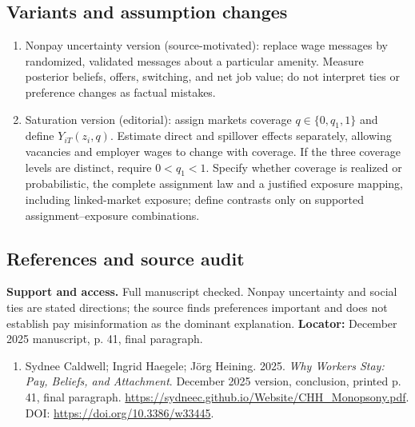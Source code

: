 \documentclass[11pt,a4paper]{article}
\begin{document}
\subsection*{Variants and assumption changes}
\begin{enumerate}
\item Nonpay uncertainty version (source-motivated): replace wage messages by randomized, validated messages about a particular amenity. Measure posterior beliefs, offers, switching, and net job value; do not interpret ties or preference changes as factual mistakes.
\item Saturation version (editorial): assign markets coverage \(q\in\{0,q_1,1\}\) and define \(Y_{iT}(z_i,q)\). Estimate direct and spillover effects separately, allowing vacancies and employer wages to change with coverage. If the three coverage levels are distinct, require \(0<q_1<1\). Specify whether coverage is realized or probabilistic, the complete assignment law and a justified exposure mapping, including linked-market exposure; define contrasts only on supported assignment--exposure combinations.
\end{enumerate}
\subsection*{References and source audit}
\textbf{Support and access.} Full manuscript checked. Nonpay uncertainty and social ties are stated directions; the source finds preferences important and does not establish pay misinformation as the dominant explanation. \textbf{Locator:} December 2025 manuscript, p. 41, final paragraph.
\begin{enumerate}\raggedright
\item\hypertarget{definitions:source:30007634:1}{} Sydnee Caldwell; Ingrid Haegele; Jörg Heining. 2025. \emph{Why Workers Stay: Pay, Beliefs, and Attachment}. December 2025 version, conclusion, printed p. 41, final paragraph.
\url{https://sydneec.github.io/Website/CHH_Monopsony.pdf}.
DOI: \url{https://doi.org/10.3386/w33445}.
\end{enumerate}
\end{document}
